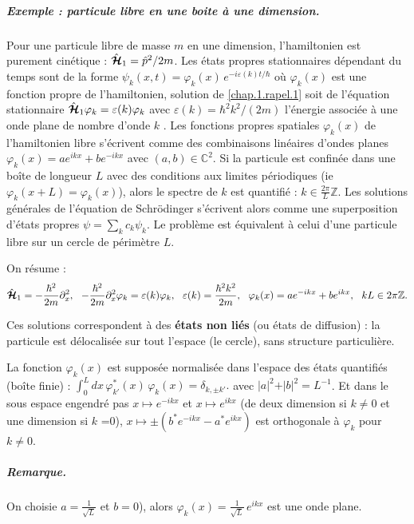 \begin{mdframed}[
	linewidth=0.5pt, 
	backgroundcolor=gray!5, 
	roundcorner=50pt,	
	innerleftmargin=5pt,
    innerrightmargin=5pt,
    innertopmargin=-10pt,
    innerbottommargin=2pt,
    leftmargin=2pt,
    rightmargin=2pt
	]
\subparagraph{Exemple : particule libre en une boite à une dimension.} Pour une particule libre de masse $m$ en une dimension, l’hamiltonien est purement cinétique : $\hat{\bm{\mathcal{H}}}_1 = \hat{p}^2 / 2m$. Les états propres stationnaires dépendant du temps sont de la forme $\psi_k(x,t) = \varphi_k(x)\,e^{-i\varepsilon(k)t/\hbar}$ où $\varphi_k(x)$ est une fonction propre de l’hamiltonien, solution de \eqref{chap.1.rapel.1} soit de  l’équation stationnaire  $\hat{\bm{\mathcal{H}}}_1\varphi_k = \varepsilon(k)\varphi_k$ avec $\varepsilon(k) = \hbar^2 k^2 / (2m)$ l’énergie associée à une onde plane de nombre d’onde $k$ . Les fonctions propres spatiales $\varphi_k(x)$ de l’hamiltonien libre s’écrivent comme des combinaisons linéaires d’ondes planes  $\varphi_k(x) = a e^{i k x} + b e^{-i k x}$ avec $(a,b) \in \mathbb{C}^2$.
Si la particule est confinée dans une boîte de longueur $L$ avec des conditions aux limites périodiques (ie $\varphi_k(x+L) = \varphi_k(x)$), alors le spectre de $k$ est quantifié : $k \in \frac{2\pi}{L} \mathbb{Z}$. Les solutions générales de l’équation de Schrödinger s’écrivent alors comme une superposition d’états propres  $\psi = \sum_k c_k \psi_k $.  Le problème est équivalent à celui d’une particule libre sur un cercle de périmètre $L$.

On résume :
\begin{eqnarray}
	\hat{\bm{\mathcal{H}}}_1 = -\frac{\hbar^2}{2m} \partial_x^2,~~-\frac{\hbar^2}{2m} \partial_x^2 \varphi_k = \varepsilon(k) \varphi_k,~~ \varepsilon(k) = \frac{\hbar^2 k^2 }{2 m}, ~~\varphi_k(x) = a e^{-i k x} + b e^{i k x},~~ kL \in 2\pi\mathbb{Z}.\label{chap.1.recap}
\end{eqnarray}
\end{mdframed}

Ces solutions correspondent à des {\bf états non liés} (ou états de diffusion) : la particule est délocalisée sur tout l’espace (le cercle), sans structure particulière.

La fonction $\varphi_k(x)$ est supposée normalisée dans l’espace des états quantifiés (boîte finie) :
\(
\int_0^L dx \, \varphi_{k'}^\ast(x)\, \varphi_k(x) = \delta_{k,\pm k'}.
\)
avec  $ \vert a \vert^2 + \vert b \vert^2 = L^{-1}$.
Et dans le sous espace engendré pas $x \mapsto e^{-ikx}$ et $x \mapsto e^{ikx}$ (de deux dimension si $k \neq 0$ et une dimension si $k$ =0), $x \mapsto \pm ( b^\ast e^{-ikx} - a^\ast e^{ikx} )$ est orthogonale à  $\varphi_k$ pour $k \neq 0$.
\begin{mdframed}[
	linewidth=0.5pt, 
	backgroundcolor=gray!5, 
	roundcorner=50pt,	
	innerleftmargin=5pt,
    innerrightmargin=5pt,
    innertopmargin=-10pt,
    innerbottommargin=2pt,
    leftmargin=2pt,
    rightmargin=2pt
	]
\subparagraph{Remarque.} On choisie  \( a = \frac{1}{\sqrt{L}} \) et \( b = 0 \)), alors
\(
\varphi_k(x) = \frac{1}{\sqrt{L}}\, e^{i k x}
\)
est une onde plane. 

\end{mdframed}

